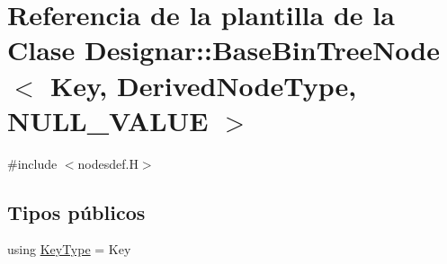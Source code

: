 \hypertarget{class_designar_1_1_base_bin_tree_node}{}\section{Referencia de la plantilla de la Clase Designar\+:\+:Base\+Bin\+Tree\+Node$<$ Key, Derived\+Node\+Type, N\+U\+L\+L\+\_\+\+V\+A\+L\+UE $>$}
\label{class_designar_1_1_base_bin_tree_node}


{\ttfamily \#include $<$nodesdef.\+H$>$}

\subsection*{Tipos públicos}
\begin{DoxyCompactItemize}
\item 
using \hyperlink{class_designar_1_1_base_bin_tree_node_adc177cc1f4ed5bb9baf467a2ff6e4e85}{Key\+Type} = Key
\end{DoxyCompactItemize}
